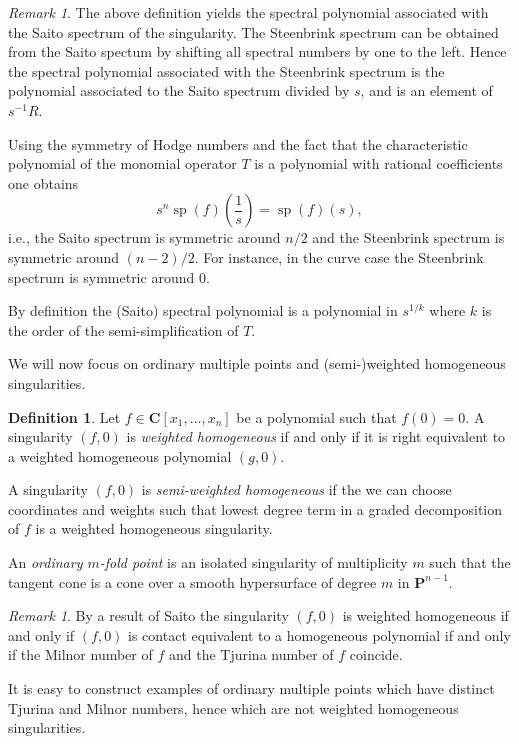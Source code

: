 \documentclass{amsart}
\newcommand{\Ps}{\mathbf{P}}
\newcommand{\C}{\mathbf{C}}
\theoremstyle{definition}
\newtheorem{definition}[lemma]{Definition}
\theoremstyle{remark}
\newtheorem{remark}[lemma]{Remark}
\DeclareMathOperator{\spe}{sp}
\begin{document}
\begin{remark}
The above definition yields the spectral polynomial associated with the Saito spectrum of the singularity. The Steenbrink spectrum can be obtained from the Saito spectum by shifting all spectral numbers  by one to the left. Hence the spectral polynomial associated with the Steenbrink spectrum  is the polynomial associated to the Saito spectrum divided by $s$, and is an element of $s^{-1}R$. 

Using the symmetry of Hodge numbers and the fact that the characteristic polynomial of the monomial operator $T$ is a polynomial with rational coefficients one obtains
\[ s^n\spe(f)\left(\frac{1}{s}\right)=\spe(f)(s),\]
i.e., the Saito spectrum is symmetric around $n/2$ and the Steenbrink spectrum is symmetric around $(n-2)/2$. For instance, in the curve case the Steenbrink spectrum is symmetric around 0.

By definition the (Saito) spectral polynomial is a polynomial in $s^{1/k}$ where $k$ is the order of the semi-simplification of $T$.
%
\end{remark}

We will now focus on ordinary multiple points and (semi-)weighted homogeneous singularities.

\begin{definition} Let $f\in \C[x_1,\dots,x_n]$ be a polynomial such that $f(0)=0$.
A singularity $(f,0)$ is \emph{weighted homogeneous} if and only if it is right equivalent to a weighted homogeneous polynomial $(g,0)$.

A singularity $(f,0)$ is \emph{semi-weighted homogeneous} if the we can choose coordinates and weights such that lowest degree term in a graded decomposition of $f$ is a weighted homogeneous singularity.

An \emph{ordinary $m$-fold point} is an isolated singularity of multiplicity $m$ such that the tangent cone is a cone over a smooth hypersurface of degree $m$ in $\Ps^{n-1}$. 
\end{definition}

\begin{remark}
By a result of Saito  \cite{SaiMilTj} the singularity $(f,0)$ is weighted homogeneous if and only if $(f,0)$ is contact equivalent to a homogeneous polynomial if and only if the Milnor number of $f$ and the Tjurina number of $f$ coincide.

It is easy to construct examples of ordinary multiple points which have distinct Tjurina and Milnor numbers, hence which are not weighted homogeneous singularities.
\end{remark}
 
\end{document}
